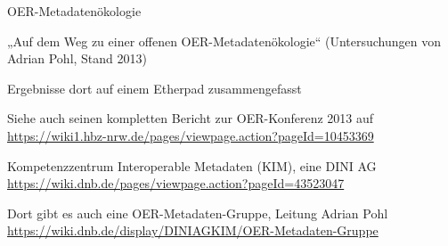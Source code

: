 \documentclass{beamer}
\begin{document}
\begin{frame}{OER-Metadatenökologie}

„Auf dem Weg zu einer offenen OER-Metadatenökologie“ (Untersuchungen von Adrian
  Pohl, Stand 2013)

Ergebnisse dort auf einem Etherpad zusammengefasst

Siehe auch seinen kompletten Bericht zur OER-Konferenz 2013 auf 
  \url{https://wiki1.hbz-nrw.de/pages/viewpage.action?pageId=10453369}

Kompetenzzentrum Interoperable Metadaten (KIM), eine DINI AG
\url{https://wiki.dnb.de/pages/viewpage.action?pageId=43523047}

Dort gibt es auch eine OER-Metadaten-Gruppe, Leitung Adrian Pohl
\url{https://wiki.dnb.de/display/DINIAGKIM/OER-Metadaten-Gruppe}
\end{frame}
\end{document}
